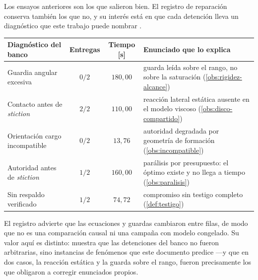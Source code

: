 Los ensayos anteriores son los que salieron bien. El registro de reparación
conserva también los que no, y su interés está en que cada detención lleva un
diagnóstico que este trabajo puede nombrar \cite{mayorga2026m1}.

\begin{observacion}
\label{obs:historial-fallos}
\begin{center}\small
\begin{tabular}{@{}lccl@{}}
\toprule
Diagnóstico del banco & Entregas & Tiempo [s] & Enunciado que lo explica \\
\midrule
Guardia angular excesiva & $0/2$ & $180{,}00$ & guarda leída sobre el rango,
  no sobre la saturación (\cref{obs:rigidez-alcance}) \\
Contacto antes de \emph{stiction} & $2/2$ & $110{,}00$ & reacción lateral
  estática ausente en el modelo viscoso (\cref{obs:disco-compartido}) \\
Orientación \textsf{cargo} incompatible & $0/2$ & $13{,}76$ & autoridad
  degradada por geometría de formación (\cref{obs:incompatible}) \\
Autoridad antes de \emph{stiction} & $1/2$ & $160{,}00$ & parálisis por
  presupuesto: el óptimo existe y no llega a tiempo (\cref{obs:paralisis}) \\
Sin respaldo verificado & $1/2$ & $74{,}72$ & compromiso sin testigo completo
  (\cref{def:testigo}) \\
\bottomrule
\end{tabular}
\end{center}

El registro advierte que las ecuaciones y guardas cambiaron entre filas, de
modo que no es una comparación causal ni una campaña con modelo congelado. Su
valor aquí es distinto: muestra que las detenciones del banco no fueron
arbitrarias, sino instancias de fenómenos que este documento predice —y que en
dos casos, la reacción estática y la guarda sobre el rango, fueron precisamente
los que obligaron a corregir enunciados propios.
\end{observacion}

